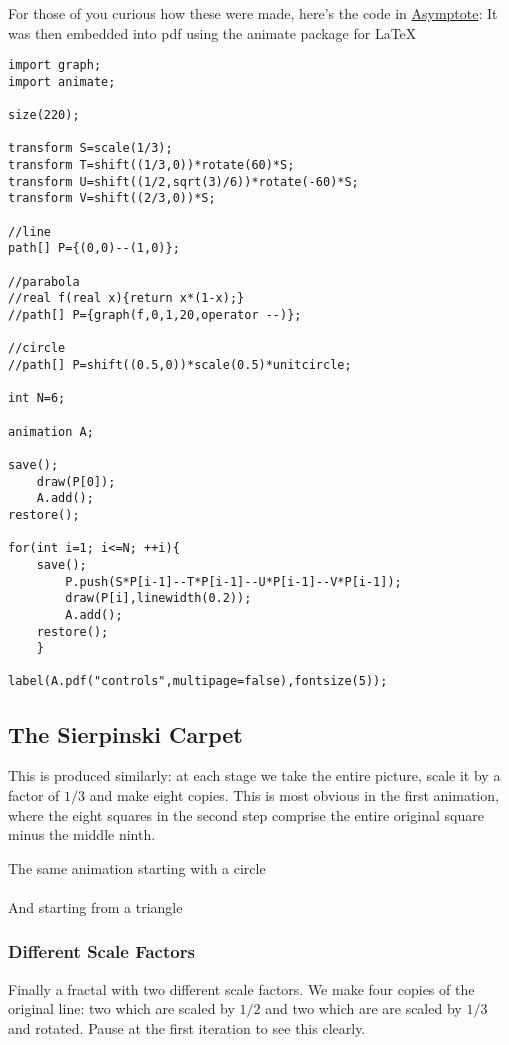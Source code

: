 For those of you curious how these were made, here's the code in \href{http://asymptote.sourceforge.net/}{Asymptote}: It was then embedded into pdf using the animate package for \LaTeX

\begin{verbatim}
import graph;
import animate;

size(220);

transform S=scale(1/3);
transform T=shift((1/3,0))*rotate(60)*S;
transform U=shift((1/2,sqrt(3)/6))*rotate(-60)*S;
transform V=shift((2/3,0))*S;

//line
path[] P={(0,0)--(1,0)};

//parabola
//real f(real x){return x*(1-x);}
//path[] P={graph(f,0,1,20,operator --)};

//circle
//path[] P=shift((0.5,0))*scale(0.5)*unitcircle;

int N=6;

animation A;

save();
	draw(P[0]);
	A.add();
restore();

for(int i=1; i<=N; ++i){
	save();
		P.push(S*P[i-1]--T*P[i-1]--U*P[i-1]--V*P[i-1]);
		draw(P[i],linewidth(0.2));
		A.add();
	restore();
	}

label(A.pdf("controls",multipage=false),fontsize(5));
\end{verbatim}


\newpage
\subsection*{The Sierpinski Carpet}

This is produced similarly: at each stage we take the entire picture, scale it by a factor of $1/3$ and make eight copies. This is most obvious in the first animation, where the eight squares in the second step comprise the entire original square minus the middle ninth.

\begin{center}
\newpage
The same animation starting with a circle\\
\\[30pt]
And starting from a triangle\\
\end{center}\newpage

\subsubsection*{Different Scale Factors}

Finally a fractal with two different scale factors. We make four copies of the original line: two which are scaled by $1/2$ and two which are are scaled by $1/3$ and rotated. Pause at the first iteration to see this clearly.

\begin{center}
\end{center}